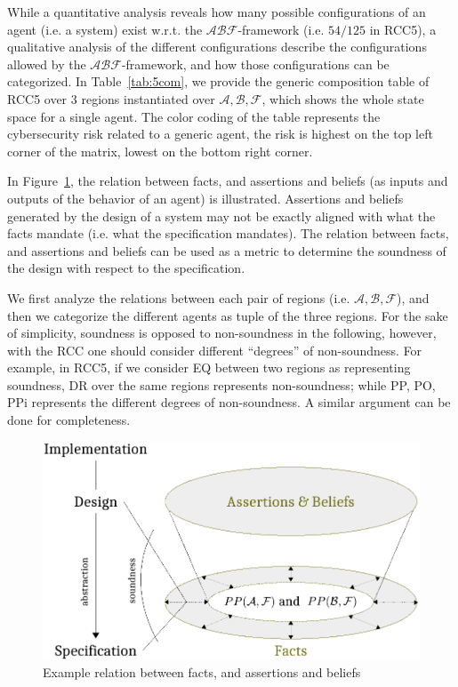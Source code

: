 \documentclass[conference]{IEEEtran}
\newcommand{\assertionRegion}{\mathcal{A}}
\newcommand{\beliefRegion}{\mathcal{B}}
\newcommand{\factRegion}{\mathcal{F}}
\newcommand{\abf}{\assertionRegion,\beliefRegion,\factRegion}
\newcommand{\abftheory}{\assertionRegion\beliefRegion\factRegion}
\begin{document}
While a quantitative analysis reveals how many possible configurations of an
agent (i.e. a system) exist w.r.t. the $\abftheory$-framework (i.e. $54/125$ in RCC5), a
qualitative analysis of the different configurations describe the
configurations allowed by the $\abftheory$-framework, and how those configurations can
be categorized.  In Table~\ref{tab:5com}, we provide the generic composition
table of RCC5 over 3 regions instantiated over $\abf$, which shows the whole
state space for a single agent. The color coding of the table represents the
cybersecurity risk related to a generic agent, the risk is highest on the top left
corner of the matrix, lowest on the bottom right corner. 

In Figure~\ref{fig:soundness}, the relation between facts, and assertions and
beliefs (as inputs and outputs of the behavior of an agent) is illustrated.
Assertions and beliefs generated by the design of a system may not be exactly
aligned with what the facts mandate (i.e. what the specification mandates).
The relation between facts, and assertions and beliefs can be used as a metric
to determine the soundness of the design with respect to the specification.

We first analyze the relations between each pair of
regions (i.e.  $\abf$), and then we categorize the different
agents as tuple of the three regions.  For the sake of simplicity, soundness is
opposed to non-soundness in the following, however, with the RCC one should
consider different ``degrees'' of non-soundness.  For example, in RCC5, if we
consider EQ between two regions as representing soundness, DR over the same
regions represents non-soundness; while PP, PO, PPi represents the different
degrees of non-soundness.  A similar argument can be done for completeness.  
\begin{figure}[t]
	\centering
	\includegraphics[width=.9\columnwidth]{soundness.pdf}
	\caption{Example relation between facts, and assertions and beliefs}
	\label{fig:soundness}
\end{figure}
\end{document}
